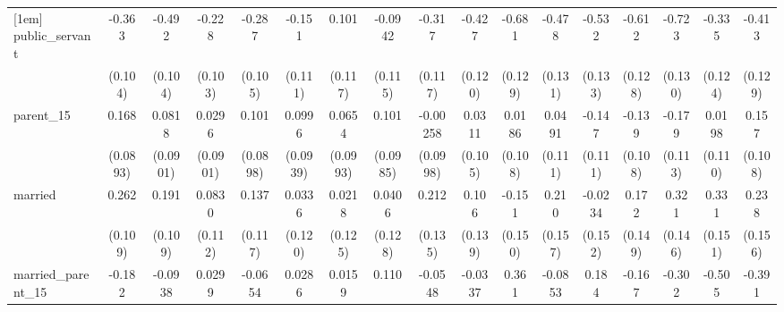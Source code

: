 {\begin{tabular}{l*{16}{c}}
[1em]
public\_servant      &      -0.363\sym{***}&      -0.492\sym{***}&      -0.228\sym{*}  &      -0.287\sym{**} &      -0.151         &       0.101         &     -0.0942         &      -0.317\sym{**} &      -0.427\sym{***}&      -0.681\sym{***}&      -0.478\sym{***}&      -0.532\sym{***}&      -0.612\sym{***}&      -0.723\sym{***}&      -0.335\sym{**} &      -0.413\sym{**} \\
                    &     (0.104)         &     (0.104)         &     (0.103)         &     (0.105)         &     (0.111)         &     (0.117)         &     (0.115)         &     (0.117)         &     (0.120)         &     (0.129)         &     (0.131)         &     (0.133)         &     (0.128)         &     (0.130)         &     (0.124)         &     (0.129)         \\
[1em]
parent\_15           &       0.168         &      0.0818         &      0.0296         &       0.101         &      0.0996         &      0.0654         &       0.101         &    -0.00258         &      0.0311         &      0.0186         &      0.0491         &      -0.147         &      -0.139         &      -0.179         &      0.0198         &       0.157         \\
                    &    (0.0893)         &    (0.0901)         &    (0.0901)         &    (0.0898)         &    (0.0939)         &    (0.0993)         &    (0.0985)         &    (0.0998)         &     (0.105)         &     (0.108)         &     (0.111)         &     (0.111)         &     (0.108)         &     (0.113)         &     (0.110)         &     (0.108)         \\
[1em]
married             &       0.262\sym{*}  &       0.191         &      0.0830         &       0.137         &      0.0336         &      0.0218         &      0.0406         &       0.212         &       0.106         &      -0.151         &       0.210         &     -0.0234         &       0.172         &       0.321\sym{*}  &       0.331\sym{*}  &       0.238         \\
                    &     (0.109)         &     (0.109)         &     (0.112)         &     (0.117)         &     (0.120)         &     (0.125)         &     (0.128)         &     (0.135)         &     (0.139)         &     (0.150)         &     (0.157)         &     (0.152)         &     (0.149)         &     (0.146)         &     (0.151)         &     (0.156)         \\
[1em]
married\_parent\_15   &      -0.182         &     -0.0938         &      0.0299         &     -0.0654         &      0.0286         &      0.0159         &       0.110         &     -0.0548         &     -0.0337         &       0.361\sym{*}  &     -0.0853         &       0.184         &      -0.167         &      -0.302         &      -0.505\sym{**} &      -0.391\sym{*}  \\

\end{tabular}}
